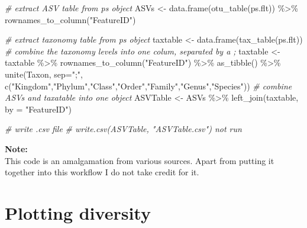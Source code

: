 \documentclass[
]{book}
\newenvironment{Shaded}{\begin{snugshade}}{\end{snugshade}}
\newcommand{\AttributeTok}[1]{\textcolor[rgb]{0.77,0.63,0.00}{#1}}
\newcommand{\CommentTok}[1]{\textcolor[rgb]{0.56,0.35,0.01}{\textit{#1}}}
\newcommand{\FunctionTok}[1]{\textcolor[rgb]{0.00,0.00,0.00}{#1}}
\newcommand{\NormalTok}[1]{#1}
\newcommand{\OtherTok}[1]{\textcolor[rgb]{0.56,0.35,0.01}{#1}}
\newcommand{\SpecialCharTok}[1]{\textcolor[rgb]{0.00,0.00,0.00}{#1}}
\newcommand{\StringTok}[1]{\textcolor[rgb]{0.31,0.60,0.02}{#1}}
\begin{document}
\begin{Shaded}
\begin{Highlighting}[]
\CommentTok{\# extract ASV table from ps object}
\NormalTok{ASVs }\OtherTok{\textless{}{-}} \FunctionTok{data.frame}\NormalTok{(}\FunctionTok{otu\_table}\NormalTok{(ps.flt)) }\SpecialCharTok{\%\textgreater{}\%} 
  \FunctionTok{rownames\_to\_column}\NormalTok{(}\StringTok{"FeatureID"}\NormalTok{)}

\CommentTok{\# extract taxonomy table from ps object}
\NormalTok{taxtable }\OtherTok{\textless{}{-}} \FunctionTok{data.frame}\NormalTok{(}\FunctionTok{tax\_table}\NormalTok{(ps.flt))}
\CommentTok{\# combine the taxonomy levels into one colum, separated by a ;}
\NormalTok{taxtable }\OtherTok{\textless{}{-}}\NormalTok{ taxtable }\SpecialCharTok{\%\textgreater{}\%}
  \FunctionTok{rownames\_to\_column}\NormalTok{(}\StringTok{"FeatureID"}\NormalTok{) }\SpecialCharTok{\%\textgreater{}\%} \FunctionTok{as\_tibble}\NormalTok{() }\SpecialCharTok{\%\textgreater{}\%}
  \FunctionTok{unite}\NormalTok{(Taxon, }\AttributeTok{sep=}\StringTok{";"}\NormalTok{, }\FunctionTok{c}\NormalTok{(}\StringTok{"Kingdom"}\NormalTok{,}\StringTok{"Phylum"}\NormalTok{,}\StringTok{"Class"}\NormalTok{,}\StringTok{"Order"}\NormalTok{,}\StringTok{"Family"}\NormalTok{,}\StringTok{"Genus"}\NormalTok{,}\StringTok{"Species"}\NormalTok{))}
\CommentTok{\# combine ASVs and taxatable into one object}
\NormalTok{ASVTable }\OtherTok{\textless{}{-}}\NormalTok{ ASVs }\SpecialCharTok{\%\textgreater{}\%} \FunctionTok{left\_join}\NormalTok{(taxtable, }\AttributeTok{by =} \StringTok{"FeatureID"}\NormalTok{)}

\CommentTok{\# write .csv file}
\CommentTok{\# write.csv(ASVTable, "ASVTable.csv") not run}
\end{Highlighting}
\end{Shaded}

\textbf{Note:}\\
This code is an amalgamation from various sources. Apart from putting it together into this workflow I do not take credit for it.

\hypertarget{plottingdiversity}{%
\chapter{Plotting diversity}\label{plottingdiversity}}
\end{document}
